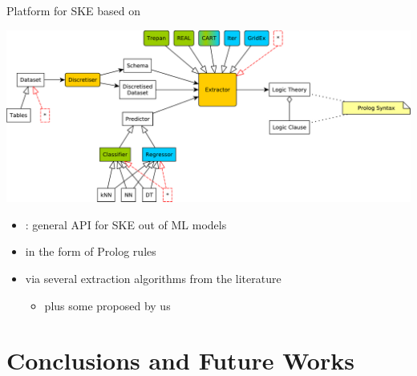 \documentclass[presentation]{beamer}\mode<presentation>{\usetheme{AMSBolognaFC}}
\begin{document}
\begin{frame}{Platform for SKE based on \twopkt{}}
    \begin{center}
        \includegraphics[width=.8\linewidth]{figures/Psyke.pdf}
    \end{center}
    \vfill
    \begin{itemize}
        \item \alert{\psyke{}}: general \alert{API} for \alert{SKE} out of ML models
        \vfill
        \item in the form of \alert{Prolog rules}
        \vfill
        \item via several extraction algorithms from the literature
        \begin{itemize}
            \item plus some proposed by us
        \end{itemize}
    \end{itemize}
\end{frame}

\section{Conclusions and Future Works}
\end{document}
